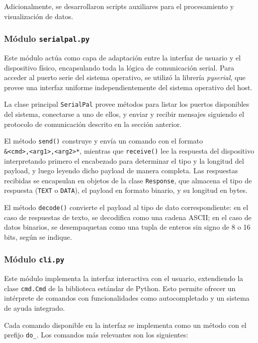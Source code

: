 \documentclass[12pt,a4paper,fleqn]{article}
\begin{document}
Adicionalmente, se desarrollaron scripts auxiliares para el procesamiento y visualización de datos.

\subsubsection{Módulo \texttt{serialpal.py}}
Este módulo actúa como capa de adaptación entre la interfaz de usuario y el dispositivo físico,
encapsulando toda la lógica de comunicación serial. Para acceder al puerto serie del sistema operativo, se utilizó la librería \textit{pyserial}, que provee una interfaz uniforme independientemente del sistema operativo del host.

La clase principal \verb|SerialPal| provee métodos para listar los puertos disponibles del sistema,
conectarse a uno de ellos, y enviar y recibir mensajes siguiendo el protocolo de comunicación descrito en la sección anterior.

El método \verb|send()| construye y envía un comando con el formato \\ \verb|&<cmd>,<arg1>,<arg2>*|, mientras que \verb|receive()| lee la respuesta del dispositivo
interpretando primero el encabezado para determinar el tipo y la longitud del payload, y luego
leyendo dicho payload de manera completa.
Las respuestas recibidas se encapsulan en objetos de la clase \verb|Response|, que almacena el
tipo de respuesta (\verb|TEXT| o \verb|DATA|), el payload en formato binario, y su longitud en
bytes. 

El método \verb|decode()| convierte el payload al tipo de dato correspondiente: en el caso
de respuestas de texto, se decodifica como una cadena ASCII; en el caso de datos binarios, se
desempaquetan como una tupla de enteros sin signo de 8 o 16 bits, según se indique.

\subsubsection{Módulo \texttt{cli.py}}

Este módulo implementa la interfaz interactiva con el usuario, extendiendo la clase \verb|cmd.Cmd|
de la biblioteca estándar de Python. Esto permite ofrecer un intérprete de comandos con
funcionalidades como autocompletado y un sistema de ayuda integrado.

Cada comando disponible en la interfaz se implementa como un método con el prefijo \verb|do_|.
Los comandos más relevantes son los siguientes:
\end{document}
